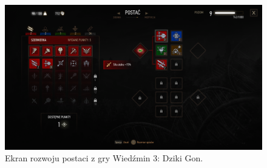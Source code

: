 \begin{figure}[h]
\centering
\includegraphics[width=1.0\textwidth]{images/wiedzmin.jpg}
\caption{Ekran rozwoju postaci z gry Wiedźmin 3: Dziki Gon.}
\end{figure}
